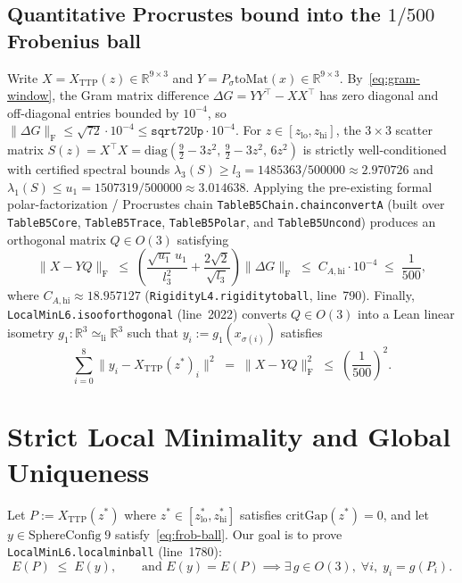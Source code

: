 \documentclass[11pt,reqno]{amsart}
\renewcommand{\_}{\origunderscore\allowbreak}
\theoremstyle{definition}
\newcommand{\R}{\mathbb{R}}
\newcommand{\norm}[1]{\lVert #1 \rVert}
\newcommand{\Frob}[1]{\lVert #1 \rVert_{\mathrm{F}}}
\newcommand{\TTP}{X_{\mathrm{TTP}}}
\begin{document}
\subsection{Quantitative Procrustes bound into the $1/500$ Frobenius ball}\label{subsec:l5-procrustes}
Write $X = \TTP(z) \in \R^{9\times 3}$ and $Y = P_\sigma \mathrm{toMat}(x) \in \R^{9\times 3}$.
By~\eqref{eq:gram-window}, the Gram matrix difference $\Delta G = Y Y^\top - X X^\top$ has zero diagonal and off-diagonal entries bounded by $10^{-4}$, so $\Frob{\Delta G} \le \sqrt{72}\cdot 10^{-4} \le \texttt{sqrt72Up}\cdot 10^{-4}$.
For $z \in [z_{\mathrm{lo}}, z_{\mathrm{hi}}]$, the $3\times 3$ scatter matrix $S(z) = X^\top X = \mathrm{diag}(\frac{9}{2}-3z^2,\, \frac{9}{2}-3z^2,\, 6z^2)$ is strictly well-conditioned with certified spectral bounds $\lambda_3(S) \ge l_3 = 1485363/500000 \approx 2.970726$ and $\lambda_1(S) \le u_1 = 1507319/500000 \approx 3.014638$.
Applying the pre-existing formal polar-factorization / Procrustes chain \texttt{TableB5Chain.chain\_convert\_A} (built over \texttt{TableB5Core}, \texttt{TableB5Trace}, \texttt{TableB5Polar}, and \texttt{TableB5Uncond}) produces an orthogonal matrix $Q \in O(3)$ satisfying
\[
  \Frob{X - YQ} \;\le\; \left(\frac{\sqrt{u_1}\,u_1}{l_3^2} + \frac{2\sqrt{2}}{\sqrt{l_3}}\right)\Frob{\Delta G}
  \;\le\; C_{A,\mathrm{hi}} \cdot 10^{-4} \;\le\; \frac{1}{500},
\]
where $C_{A,\mathrm{hi}} \approx 18.957127$ (\texttt{RigidityL4.rigidity\_to\_ball}, line~790).
Finally, \texttt{LocalMinL6.iso\_of\_orthogonal} (line~2022) converts $Q \in O(3)$ into a Lean linear isometry $g_1 : \R^3 \simeq_{\mathrm{li}} \R^3$ such that $y_i := g_1(x_{\sigma(i)})$ satisfies
\begin{equation}\label{eq:frob-ball}
  \sum_{i=0}^8 \norm{y_i - \TTP(z^*)_i}^2 \;=\; \Frob{X - YQ}^2 \;\le\; \left(\frac{1}{500}\right)^2.
\end{equation}

\section{Strict Local Minimality and Global Uniqueness}\label{sec:local}

Let $P := \TTP(z^*)$ where $z^* \in [z^*_{\mathrm{lo}}, z^*_{\mathrm{hi}}]$ satisfies $\mathrm{critGap}(z^*) = 0$, and let $y \in \mathrm{SphereConfig}\;9$ satisfy~\eqref{eq:frob-ball}.
Our goal is to prove \texttt{LocalMinL6.local\_min\_ball} (line~1780):
\begin{equation}\label{eq:local-min-goal}
  E(P) \;\le\; E(y), \qquad \text{and } E(y) = E(P) \implies \exists\, g \in O(3),\;\forall i,\; y_i = g(P_i).
\end{equation}
\end{document}
